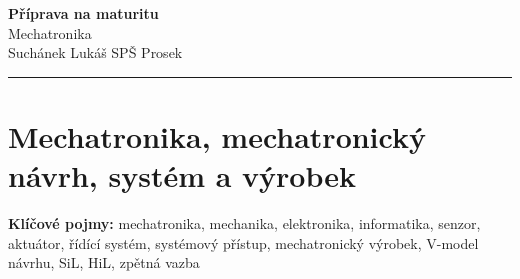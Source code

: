 \documentclass[a4paper,10pt]{article}
\begin{document}
\begin{minipage}[t]{0.75\textwidth}
    {\Huge\bfseries\color{accent} Příprava na maturitu}\\[4pt]
    {\large\color{stripeblue} Mechatronika}\\[2pt]
    \textcolor{medgray}{\small Suchánek Lukáš \quad SPŠ Prosek }
\end{minipage}
\hfill
\begin{minipage}[t]{0.22\textwidth}
    \raggedleft
\end{minipage}

\vspace{6pt}
\noindent\color{accent}\rule{\linewidth}{1.5pt}
\vspace{2pt}

\section{Mechatronika, mechatronický návrh, systém a výrobek}

\begin{pojmybox}
\textbf{Klíčové pojmy:}
mechatronika, mechanika, elektronika, informatika,
senzor, aktuátor, řídící systém, systémový přístup, mechatronický výrobek,
V-model návrhu, SiL, HiL, zpětná vazba
\end{pojmybox}
\end{document}
